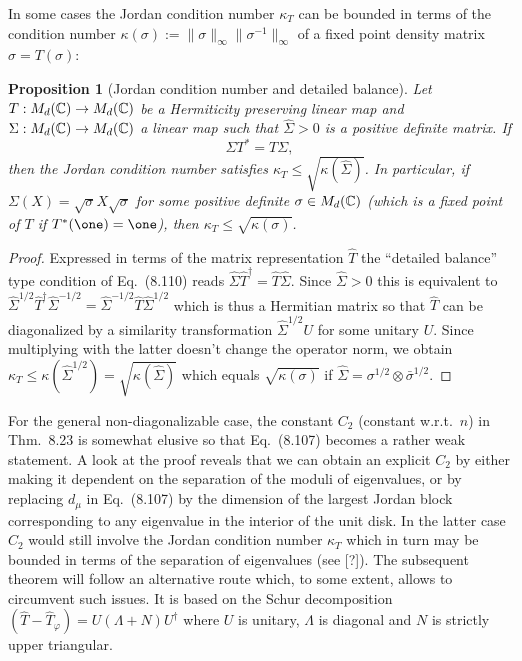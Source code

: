 \documentclass[11pt,a4paper]{article}
\theoremstyle{plain}
\newtheorem{proposition}{Proposition}[section]
\theoremstyle{definition}
\theoremstyle{remark}
\begin{document}
In some cases the Jordan condition number $\kappa_T$ can be bounded in terms of the condition number $\kappa(\sigma):=\|\sigma\|_\infty\|\sigma^{-1}\|_\infty$
of a fixed point density matrix $\sigma=T(\sigma)$:

\begin{proposition}[Jordan condition number and detailed balance]
    Let $T:M_d(\mathbb{C})\to M_d(\mathbb{C})$ be a Hermiticity preserving linear map and $\Sigma:M_d(\mathbb{C})\to M_d(\mathbb{C})$ a linear map such that $\hat{\Sigma}>0$ is a positive definite matrix.
    If
    \begin{equation}\tag{8.110}
        \Sigma T^\ast = T\Sigma,
    \end{equation}
    then the Jordan condition number satisfies $\kappa_T \le \sqrt{\kappa(\hat{\Sigma})}$.
    In particular, if $\Sigma(X)=\sqrt{\sigma}X\sqrt{\sigma}$ for some positive definite $\sigma\in M_d(\mathbb{C})$ (which is a fixed point of $T$ if $T^\ast(\one)=\one$),
    then $\kappa_T\le \sqrt{\kappa(\sigma)}$.
\end{proposition}

\begin{proof}
    Expressed in terms of the matrix representation $\hat{T}$ the ``detailed balance'' type condition of Eq.~(8.110) reads $\hat{\Sigma}\hat{T}^\dagger=\hat{T}\hat{\Sigma}$.
    Since $\hat{\Sigma}>0$ this is equivalent to $\hat{\Sigma}^{1/2}\hat{T}^\dagger\hat{\Sigma}^{-1/2} = \hat{\Sigma}^{-1/2}\hat{T}\hat{\Sigma}^{1/2}$ which is thus a Hermitian matrix so that
    $\hat{T}$ can be diagonalized by a similarity transformation $\hat{\Sigma}^{1/2}U$ for some unitary $U$. Since multiplying with the latter doesn't change the operator norm,
    we obtain $\kappa_T \le \kappa(\hat{\Sigma}^{1/2})=\sqrt{\kappa(\hat{\Sigma})}$ which equals $\sqrt{\kappa(\sigma)}$ if $\hat{\Sigma}=\sigma^{1/2}\otimes \bar{\sigma}^{1/2}$.
\end{proof}

For the general non-diagonalizable case, the constant $C_2$ (constant w.r.t.\ $n$) in Thm.~8.23 is somewhat elusive so that Eq.~(8.107) becomes a rather weak statement.
A look at the proof reveals that we can obtain an explicit $C_2$ by either making it dependent on the separation of the moduli of eigenvalues, or by replacing $d_\mu$ in Eq.~(8.107)
by the dimension of the largest Jordan block corresponding to any eigenvalue in the interior of the unit disk. In the latter case $C_2$ would still involve the Jordan condition number
$\kappa_T$ which in turn may be bounded in terms of the separation of eigenvalues (see [?]). The subsequent theorem will follow an alternative route which, to some extent, allows to circumvent such issues.
It is based on the Schur decomposition $(\hat{T}-\hat{T}_\varphi)=U(\Lambda+N)U^\dagger$ where $U$ is unitary, $\Lambda$ is diagonal and $N$ is strictly upper triangular.
\end{document}
